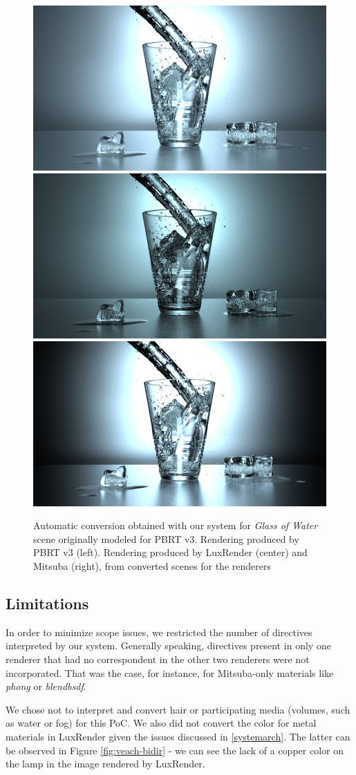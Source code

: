 \begin{figure}
\centering
\includegraphics[width=0.32\linewidth]{figs/4_results/glass_of_water/1_from_pbrt.png}
\includegraphics[width=0.32\linewidth]{figs/4_results/glass_of_water/2_to_lux.png}
\includegraphics[width=0.32\linewidth]{figs/4_results/glass_of_water/3_to_mitsuba.png}
\caption{Automatic conversion obtained with our system for \textit{Glass of Water}
scene originally modeled for PBRT v3. Rendering produced by PBRT v3 (left).
Rendering produced by LuxRender (center) and Mitsuba (right),
from converted scenes for the renderers}
\label{fig:glass-of-water}
\end{figure}

\subsection{Limitations}
In order to minimize scope issues, we restricted the number of directives 
interpreted by our system. Generally speaking, directives present in only one 
renderer that had no correspondent in the other two renderers were not 
incorporated. That was the case, for instance, for Mitsuba-only materials like 
\textit{phong} or \textit{blendbsdf}. 

We chose not to interpret and convert hair or participating media (volumes, such 
as water or fog) for this PoC. We also did not convert the color for metal 
materials in LuxRender given the issues discussed in \ref{systemarch}. The 
latter can be observed in Figure \ref{fig:veach-bidir} - we can see the lack of a 
copper color on the lamp in the image rendered by LuxRender.





